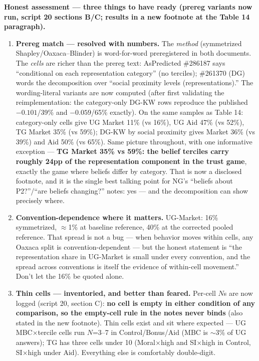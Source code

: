 \documentclass[11pt]{article}
\begin{document}
\textbf{Honest assessment --- three things to have ready (prereg variants now run, script 20 sections B/C; results in a new footnote at the Table 14 paragraph).}
\begin{enumerate}
\item \textbf{Prereg match --- resolved with numbers.} The \emph{method} (symmetrized Shapley/Oaxaca--Blinder) is word-for-word preregistered in both documents. The \emph{cells} are richer than the prereg text: AsPredicted \#286187 says ``conditional on each representation category'' (no terciles); \#261370 (DG) words the decomposition over ``social proximity levels (representations).'' The wording-literal variants are now computed (after first validating the reimplementation: the category-only DG-KW rows reproduce the published $-0.101$/39\% and $-0.059$/65\% exactly). On the same samples as Table 14: category-only cells give UG Market 11\% (vs 16\%), UG Aid 47\% (vs 52\%), TG Market 35\% (vs 59\%); DG-KW by social proximity gives Market 36\% (vs 39\%) and Aid 50\% (vs 65\%). Same picture throughout, with one informative exception --- \textbf{TG Market 35\% vs 59\%: the belief terciles carry roughly 24pp of the representation component in the trust game}, exactly the game where beliefs differ by category. That is now a disclosed footnote, and it is the single best talking point for NG's ``beliefs about P2?''/``are beliefs changing?'' notes: yes --- and the decomposition can show precisely where.
\item \textbf{Convention-dependence where it matters.} UG-Market: 16\% symmetrized, $\approx$1\% at baseline reference, 40\% at the corrected pooled reference. That spread is not a bug --- when behavior moves within cells, any Oaxaca split is convention-dependent --- but the honest statement is ``the representation share in UG-Market is small under every convention, and the spread across conventions is itself the evidence of within-cell movement.'' Don't let the 16\% be quoted alone.
\item \textbf{Thin cells --- inventoried, and better than feared.} Per-cell $N$s are now logged (script 20, section C): \textbf{no cell is empty in either condition of any comparison, so the empty-cell rule in the notes never binds} (also stated in the new footnote). Thin cells exist and sit where expected --- UG MBC$\times$tercile cells run $N$=3--7 in Control/Bonus/Aid (MBC is $\sim$3\% of UG answers); TG has three cells under 10 (Moral$\times$high and SI$\times$high in Control, SI$\times$high under Aid). Everything else is comfortably double-digit.
\end{enumerate}
\end{document}
